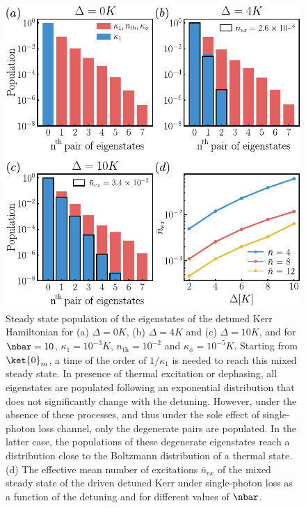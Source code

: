 \begin{figure}[t!]
    \centering
    \includegraphics[width=\columnwidth]{file/image/thermal_state_V2.pdf}
    \vspace{-0.5cm}
    \caption{\label{fig:thermalstate}
    Steady state population of the eigenstates of the detuned Kerr Hamiltonian for (a) $\Delta = 0K$, (b) $\Delta = 4K$ and (c) $\Delta = 10K$, and for $\nbar = 10$, $\kappa_1 = 10^{-3}K$, $n_{\text{th}}=10^{-2}$ and $\kappa_\phi = 10^{-5}K$. Starting from $\ket{0}_m$, a time of the order of $1/\kappa_1$ is needed to reach this mixed steady state. In presence of thermal excitation or dephasing, all eigenstates are populated following an exponential distribution that does not significantly change with the detuning. However, under the absence of these processes, and thus under the sole effect of single-photon loss channel, only the degenerate pairs are populated. In the latter case, the populations of these degenerate eigenstates reach a distribution close to the Boltzmann distribution of a thermal state. (d) The effective mean number of excitations $\bar n_{ex}$ of the mixed steady state of the driven detuned Kerr under single-photon loss as a function of the detuning and for different values of $\nbar$. 
    }
\end{figure}



